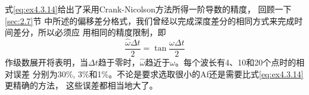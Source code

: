 式\ref{eq:ex4.3.14}给出了采用Crank-Nicolson方法所得一阶导数的精度，
回顾一下\ref{sec:2.7}节
中所述的偏移差分格式，我们曾经以完成深度差分的相同方式来完成时间差分，所以必须应
用相同的精度限制，即
\begin{equation}
\frac{\hat{\omega}\Delta t}{2}=\tan\frac{\omega \Delta t}{2}
\label{eq:ex4.3.15}
\end{equation}
作级数展开将表明，当$\Delta t$趋于零时，$\hat{\omega}$趋近于$\omega$。每个波长有4、10和20个点时的相对误差
分别为30\%, 3\%和1\%。不论是要求选取很小的Af还是需要比式\ref{eq:ex4.3.14}更精确的方法， 这些误差都相当地大了。



